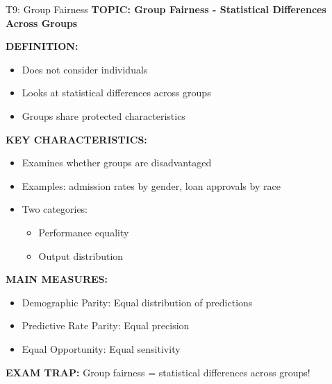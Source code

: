 \documentclass[8pt]{beamer}
\begin{document}
	\begin{frame}{T9: Group Fairness}
		\fontsize{6.5}{7.5}\selectfont
		\textbf{TOPIC: Group Fairness - Statistical Differences Across Groups}
		
		\vspace{0.1cm}
		\textbf{DEFINITION:}
		\begin{itemize}
			\item Does not consider individuals
			\item Looks at statistical differences across groups
			\item Groups share protected characteristics
		\end{itemize}
		
		\vspace{0.1cm}
		\textbf{KEY CHARACTERISTICS:}
		\begin{itemize}
			\item Examines whether groups are disadvantaged
			\item Examples: admission rates by gender, loan approvals by race
			\item Two categories:
			\begin{itemize}
				\item Performance equality
				\item Output distribution
			\end{itemize}
		\end{itemize}
		
		\vspace{0.1cm}
		\textbf{MAIN MEASURES:}
		\begin{itemize}
			\item \textcolor{myblue}{Demographic Parity:} Equal distribution of predictions
			\item \textcolor{myblue}{Predictive Rate Parity:} Equal precision
			\item \textcolor{myblue}{Equal Opportunity:} Equal sensitivity
		\end{itemize}
		
		\textcolor{myred}{\textbf{EXAM TRAP:}} Group fairness = \textcolor{myblue}{statistical differences across groups}!
	\end{frame}
	
\end{document}
